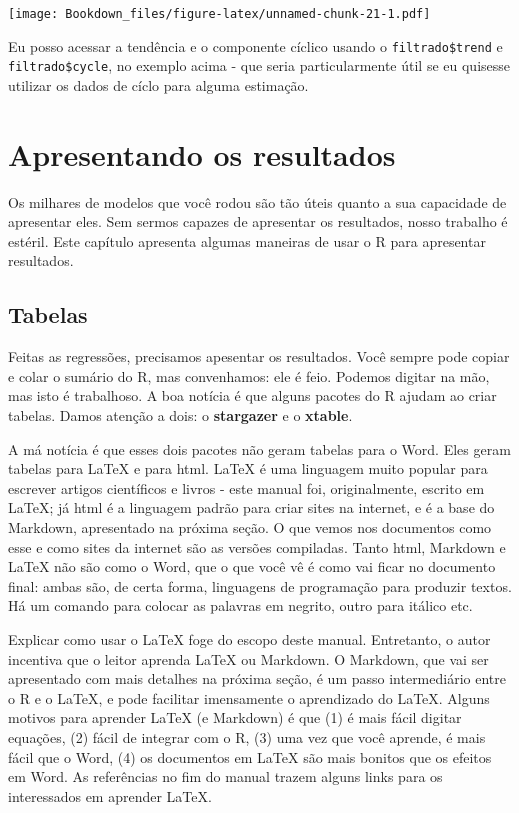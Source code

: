\documentclass[
]{book}
\begin{document}
\texttt{[image: Bookdown\_files/figure-latex/unnamed-chunk-21-1.pdf]}

Eu posso acessar a tendência e o componente cíclico usando o \texttt{filtrado\$trend} e \texttt{filtrado\$cycle}, no exemplo acima - que seria particularmente útil se eu quisesse utilizar os dados de cíclo para alguma estimação.

\hypertarget{apresentando-os-resultados}{%
\chapter{Apresentando os resultados}\label{apresentando-os-resultados}}

Os milhares de modelos que você rodou são tão úteis quanto a sua capacidade de apresentar eles. Sem sermos capazes de apresentar os resultados, nosso trabalho é estéril. Este capítulo apresenta algumas maneiras de usar o R para apresentar resultados.

\hypertarget{tabelas}{%
\section{Tabelas}\label{tabelas}}

Feitas as regressões, precisamos apesentar os resultados. Você sempre pode copiar e colar o sumário do R, mas convenhamos: ele é feio. Podemos digitar na mão, mas isto é trabalhoso. A boa notícia é que alguns pacotes do R ajudam ao criar tabelas. Damos atenção a dois: o \textbf{stargazer} e o \textbf{xtable}.

A má notícia é que esses dois pacotes não geram tabelas para o Word. Eles geram tabelas para LaTeX e para html. LaTeX é uma linguagem muito popular para escrever artigos científicos e livros - este manual foi, originalmente, escrito em LaTeX; já html é a linguagem padrão para criar sites na internet, e é a base do Markdown, apresentado na próxima seção. O que vemos nos documentos como esse e como sites da internet são as versões compiladas. Tanto html, Markdown e LaTeX não são como o Word, que o que você vê é como vai ficar no documento final: ambas são, de certa forma, linguagens de programação para produzir textos. Há um comando para colocar as palavras em negrito, outro para itálico etc.

Explicar como usar o LaTeX foge do escopo deste manual. Entretanto, o autor incentiva que o leitor aprenda LaTeX ou Markdown. O Markdown, que vai ser apresentado com mais detalhes na próxima seção, é um passo intermediário entre o R e o LaTeX, e pode facilitar imensamente o aprendizado do LaTeX. Alguns motivos para aprender LaTeX (e Markdown) é que (1) é mais fácil digitar equações, (2) fácil de integrar com o R, (3) uma vez que você aprende, é mais fácil que o Word, (4) os documentos em LaTeX são mais bonitos que os efeitos em Word. As referências no fim do manual trazem alguns links para os interessados em aprender LaTeX.
\end{document}
